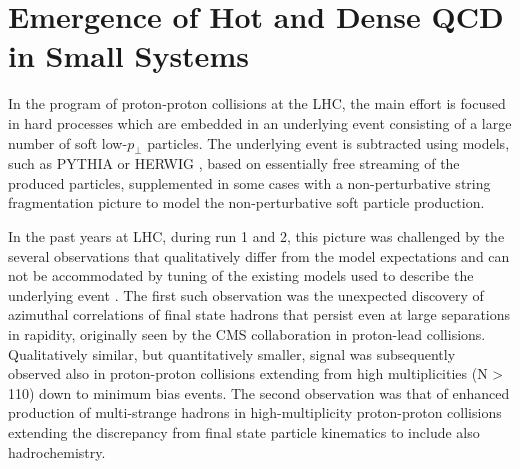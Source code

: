 \documentclass[../report.tex]{subfiles}
\begin{document}
\section{Emergence of Hot and Dense QCD in Small Systems}
In the program of proton-proton collisions at the LHC, the main effort is focused in hard processes which are embedded in an 
underlying event consisting of a large number of soft low-$p_\perp$ particles. The underlying event is subtracted using models, such as PYTHIA \cite{Sjostrand:2014zea} or HERWIG \cite{Bellm:2015jjp}, based on essentially free streaming of the produced particles, supplemented in some cases with a non-perturbative string fragmentation picture \cite{Andersson:1983ia} to model the non-perturbative soft particle production.  

In the past years at LHC, during run 1 and 2, this picture was challenged by the several observations that qualitatively differ from the model expectations and can not be accommodated by tuning of the existing models used to describe the underlying event \cite{Fischer:2016zzs}.
The first such observation was the unexpected discovery of azimuthal correlations of final state hadrons that persist even at large separations in rapidity, originally seen by the CMS collaboration in proton-lead collisions. Qualitatively similar, but quantitatively smaller, signal was subsequently observed also in proton-proton collisions extending from high multiplicities (N > 110) down to minimum bias events. The second observation was that of enhanced production of multi-strange hadrons in high-multiplicity proton-proton collisions extending the discrepancy from final state particle kinematics to include also hadrochemistry. 
\end{document}
